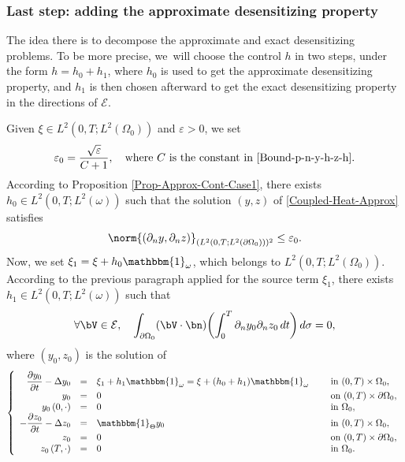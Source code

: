 \subsubsection*{Last step: adding the approximate desensitizing property} The idea there is to decompose the approximate and exact desensitizing problems. To be more precise, we~will choose the control $h$ in two steps, under the form $h = h_0 + h_1$, where $h_0$ is used to get the approximate desensitizing property, and $h_1$ is then chosen afterward to get the exact desensitizing property in the directions of $\mathcal{E}$.

Given $\xi \in L^2(0,T; L^2(\Omega_0))$ and $\varepsilon >0$, we set
\begin{equation*}
\varepsilon_0 = \frac{{\sqrt{\varepsilon}}}{C+1}, \quad\text{where $C$ is the constant in \eqref{Bound-p-n-y-h-z-h}}.
\end{equation*}
According to Proposition \ref{Prop-Approx-Cont-Case1}, there exists $h_0 \in L^2(0,T; L^2(\omega))$ such that the solution $(y,z)$ of \eqref{Coupled-Heat-Approx} satisfies
\begin{equation}
\label{Approx-Result-First}
\norm{(\partial_n y, \partial_n z)}_{(L^2(0,T; L^2(\partial \Omega_0)))^2}
\leq
\varepsilon_0.
\end{equation}
Now, we set $\xi_1 = \xi + h_0 \mathbbm{1}_\omega$, which belongs to $L^2(0,T; L^2(\Omega_0))$. According to the previous paragraph applied for the source term $\xi_1$, there exists $h_1 \in L^2(0,T;L^2(\omega))$ such that
\begin{equation}
\label{Exact-insensitizing-E}
\forall \bV \in \mathcal{E},
\quad
\int_{\partial\Omega_{0}}(\bV\cdot \bn)
\biggl(\int_{0}^{T}\partial_{n}y_{0}\partial_{n} z_{0}\, dt \biggr)\,
d\sigma
=0,
\end{equation}
where $(y_0, z_0)$ is the solution of
\begin{equation}
\label{y-Omega-00}
\left\{
\begin{array}{rcll}
\dfrac{\partial y_0}{\partial t}-\Delta y_0 &=&\xi_1 +h_1\mathbbm{1}_{\omega}= \xi + (h_0 + h_1) \mathbbm{1}_\omega \quad&\text{ in }(0,T) \times \Omega_0,
\\
y_0 &=& 0 &\text{ on }(0,T) \times \partial \Omega_0,
\\
y_0\left(0,\cdot\right) &=& 0 &\text{ in }\Omega_0,
\\
-\dfrac{\partial z_0}{\partial t}-\Delta z_0 &=&\mathbbm{1}_{\Theta}y_0 &\text{ in }(0,T) \times \Omega_0,
\\
z_0 &=& 0 &\text{ on }(0,T) \times \partial \Omega_0,
\\
z_0\left(T,\cdot\right) &=& 0 &\text{ in }\Omega_0.
\end{array}
\right.
\end{equation}

